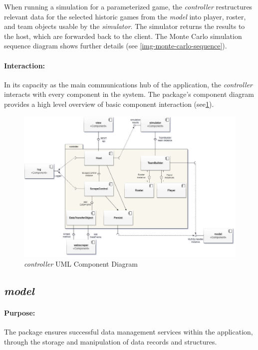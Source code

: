 \documentclass{thesis-ekf}
\theoremstyle{definition}
\theoremstyle{remark}
\begin{document}
When running a simulation for a parameterized game, the \emph{controller} restructures relevant data for the selected historic games from the \emph{model} into player, roster, and team objects usable by the \emph{simulator}. The simulator returns the results to the host, which are forwarded back to the client. The Monte Carlo simulation sequence diagram shows further details (see {\ref{img-monte-carlo-sequence}}).

\paragraph{Interaction:}
In its capacity as the main communications hub of the application, the \emph{controller} interacts with every component in the system. The package's component diagram provides a high level overview of basic component interaction (see{\ref{img-controller-component}}).

\begin{figure}[th!]
	\centering
	\includegraphics[width=1\linewidth]{img/component/component_controller}
	\caption{\emph{controller} UML Component Diagram}
	\label{img-controller-component}
\end{figure}

\subsection{\emph{model}}
\paragraph{Purpose:}
The package ensures successful data management services within the application, through the storage and manipulation of data records and structures. 
\end{document}
